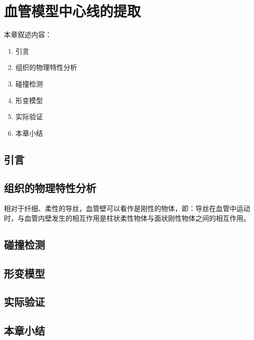 \chapter{血管模型中心线的提取}
\label{chap7}

本章叙述内容：
\begin{enumerate}
  \item 引言
  \item 组织的物理特性分析
  \item 碰撞检测
  \item 形变模型
  \item 实际验证
  \item 本章小结
\end{enumerate}

\section{引言}

\section{组织的物理特性分析}

相对于纤细、柔性的导丝，血管壁可以看作是刚性的物体\cite{BroNielsen1997DK}，即：导丝在血管中运动时，与血管内壁发生的相互作用是柱状柔性物体与面状刚性物体之间的相互作用。

\section{碰撞检测}

\section{形变模型}

\section{实际验证}

\section{本章小结}
